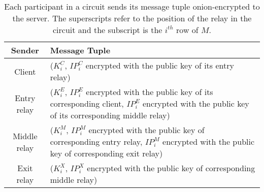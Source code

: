 \begin{table}
\begin{center}
  \begin{tabular}{ |c || p{9cm}| }
  \hline
  Sender & Message Tuple \\ \hline
  Client & ($K_{i}^{C}$, {$IP_{i}^{C}$ encrypted with the public key of its 
  entry relay}) \\ \hline
  Entry relay & ($K_{i}^{E}$, {$IP_{i}^{E}$ encrypted with the public key of 
  its corresponding client}, {$IP_{i}^{E}$ encrypted with the public key of 
  its corresponding middle relay}) \\ \hline
  Middle relay & ($K_{i}^{M}$, {$IP_{i}^{M}$ encrypted with the public key of 
  corresponding entry relay}, {$IP_{i}^{M}$ encrypted with the public key of 
  corresponding exit relay}) \\ \hline
  Exit relay & ($K_{i}^{X}$, {$IP_{i}^{X}$ encrypted with the public key of 
  corresponding middle relay}) \\ \hline
  \end{tabular}
\end{center}
\caption{Each participant in a circuit sends its message 
tuple onion-encrypted to the server. The superscripts refer to the position 
of the relay in the circuit and the subscript is the $i^{th}$ row of $M$.}
\label{table:message_format}
\end{table}


